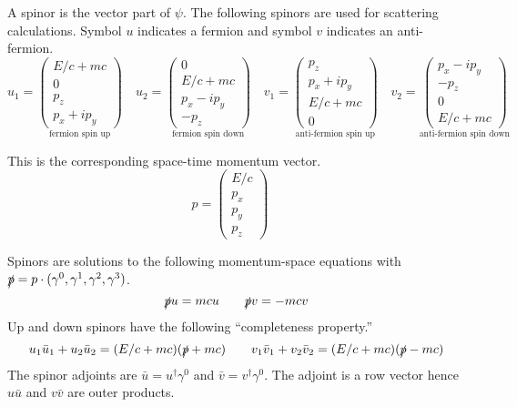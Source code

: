 \documentclass[12pt]{article}
\begin{document}
\noindent
A spinor is the vector part of $\psi$.
The following spinors are used for scattering calculations.
Symbol $u$ indicates a fermion and symbol $v$ indicates an anti-fermion.
\begin{equation*}
u_1=\underset{\text{fermion spin up}}{\begin{pmatrix}E/c+mc\\0\\p_z\\p_x+ip_y\end{pmatrix}}
\quad
u_2=\underset{\text{fermion spin down}}{\begin{pmatrix}0\\E/c+mc\\p_x-ip_y\\-p_z\end{pmatrix}}
\quad
v_1=\underset{\text{anti-fermion spin up}}{\begin{pmatrix}p_z\\p_x+ip_y\\E/c+mc\\0\end{pmatrix}}
\quad
v_2=\underset{\text{anti-fermion spin down}}{\begin{pmatrix}p_x-ip_y\\-p_z\\0\\E/c+mc\end{pmatrix}}
\end{equation*}

\noindent
This is the corresponding space-time momentum vector.
$$
p=\begin{pmatrix}E/c\\p_x\\p_y\\p_z\end{pmatrix}\quad
$$

\noindent
Spinors are solutions to the following momentum-space equations with
$\slashed{p}=p\cdot(\gamma^0,\gamma^1,\gamma^2,\gamma^3)$.
$$
\slashed{p}u=mcu\qquad\slashed{p}v=-mcv
$$
Up and down spinors have the following ``completeness property.''
$$
u_1\bar{u}_1+u_2\bar{u}_2=(E/c+mc)(\slashed{p}+mc)\qquad
v_1\bar{v}_1+v_2\bar{v}_2=(E/c+mc)(\slashed{p}-mc)
$$
The spinor adjoints are $\bar{u}=u^\dag\gamma^0$ and $\bar{v}=v^\dag\gamma^0$.
The adjoint is a row vector hence $u\bar{u}$ and $v\bar{v}$ are outer products.
\end{document}
